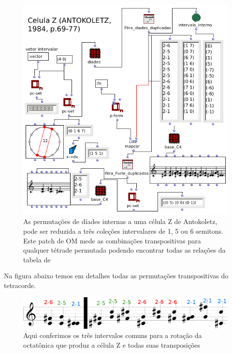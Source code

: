 \documentclass[
	12pt,				%
	openright,			%
	twoside,			%
	a4paper,			%
	english,			%
	french,				%
	spanish,			%
	brazil				%
	]{abntex2}
\begin{document}
\begin{figure}[!h]
	\caption{\label{fig_grafico} As permutações de díades internas a uma célula Z de Antokoletz, pode ser reduzida a três coleções intervalares de 1, 5 ou 6 semitons. Este patch de OM mede as combinações transpositivas para qualquer tétrade permutada podendo encontrar todas as relações da tabela de  }
	\begin{center}
	    \includegraphics[scale=0.5]{strategies/RotacionaZ.png}
	\end{center}
\end{figure}

Na figura abaixo temos em detalhes todas as permutações transpositivas do tetracorde.

\begin{figure}[!h]
	\caption{\label{fig_grafico} Aqui conferimos os três intervalos comuns para a rotação da octatônica que produz a célula Z e todas suas transposições}
	\begin{center}
	    \includegraphics[scale=0.35]{strategies/strategieZCELL.png}
	\end{center}
\end{figure}
\end{document}
